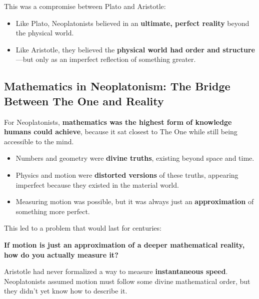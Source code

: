 This was a compromise between Plato and Aristotle:

\begin{itemize}
    \item Like Plato, Neoplatonists believed in an \textbf{ultimate, perfect reality} beyond the physical world.
    \item Like Aristotle, they believed the \textbf{physical world had order and structure}—but only as an imperfect reflection of something greater.
\end{itemize}

\subsection{Mathematics in Neoplatonism: The Bridge Between The One and Reality}

For Neoplatonists, \textbf{mathematics was the highest form of knowledge humans could achieve}, because it sat closest to The One while still being accessible to the mind.

\begin{itemize}
    \item Numbers and geometry were \textbf{divine truths}, existing beyond space and time.
    \item Physics and motion were \textbf{distorted versions} of these truths, appearing imperfect because they existed in the material world.
    \item Measuring motion was possible, but it was always just an \textbf{approximation} of something more perfect.
\end{itemize}

This led to a problem that would last for centuries:

\textbf{If motion is just an approximation of a deeper mathematical reality, how do you actually measure it?}

Aristotle had never formalized a way to measure \textbf{instantaneous speed}. Neoplatonists assumed motion must follow some divine mathematical order, but they didn’t yet know how to describe it.

